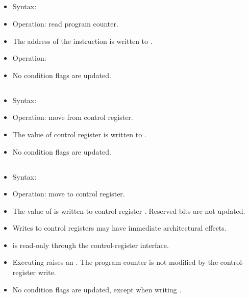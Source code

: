 \subsection{}

\begin{itemize}
  \item Syntax: 
  \item Operation: read program counter.
  \item The address of the  instruction is written to .
  \item Operation: 
  \item No condition flags are updated.
\end{itemize}

\subsection{}

\begin{itemize}
  \item Syntax: 
  \item Operation: move from control register.
  \item The value of control register  is written to .
  \item No condition flags are updated.
\end{itemize}

\subsection{}

\begin{itemize}
  \item Syntax: 
  \item Operation: move to control register.
  \item The value of  is written to control register . Reserved
        bits are not updated.
  \item Writes to control registers may have immediate architectural effects.
  \item {} is read-only through the control-register interface.
  \item Executing  raises an
        . The program counter is not modified by the
        control-register write.
  \item No condition flags are updated, except when writing .
\end{itemize}

